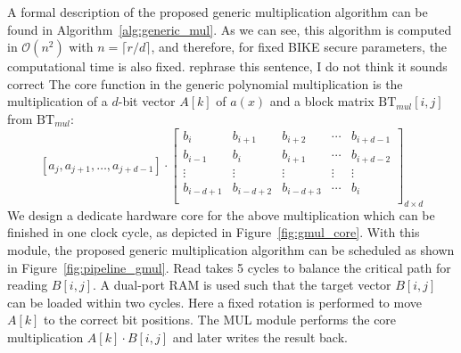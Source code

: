 \documentclass[runningheads]{llncs}
\begin{document}
A formal description of the proposed generic multiplication algorithm
can be found in Algorithm~\ref{alg:generic_mul}. 
As we can see, this algorithm is computed in $\mathcal{O}(n^2)$ with $n=\lceil r/d\rceil$, and therefore, for fixed BIKE secure parameters, the computational time is also fixed.  
{\color{red} rephrase this sentence, I do not think it sounds correct}
The core function in the generic polynomial multiplication
is the multiplication of a $d$-bit vector $A[k]$ of $a(x)$ and a block matrix $\text{BT}_{mul}$$[i,j]$ from $\text{BT}_{mul}$:
\[
    [a_j,a_{j+1},\ldots,a_{j+d-1}]\cdot
\left[ \begin{array}{ccccc}
b_{i}&b_{i+1}&b_{i+2}&\cdots &b_{i+d-1} \\
b_{i-1}&b_{i}&b_{i+1}&\cdots &b_{i+d-2} \\
\vdots&\vdots&\vdots&\vdots&\vdots\\
b_{i-d+1}&b_{i-d+2}&b_{i-d+3}&\cdots &b_{i} \\
\end{array}
\right ]_{d\times d}
\]
We design a dedicate hardware core for the above multiplication which can be 
finished in one clock cycle, as depicted in Figure~\ref{fig:gmul_core}. 
With this module, the proposed generic multiplication algorithm 
can be scheduled as shown in Figure~\ref{fig:pipeline_gmul}. 
Read takes 5 cycles to balance the critical path for reading $B[i,j]$. 
A dual-port RAM is used such that the target vector $B[i,j]$ can be loaded within two cycles. Here a fixed rotation is performed to move $A[k]$ to the correct bit positions. 
The MUL module performs the core multiplication $A[k]\cdot B[i,j]$ and later writes 
the result back.




\end{document}
